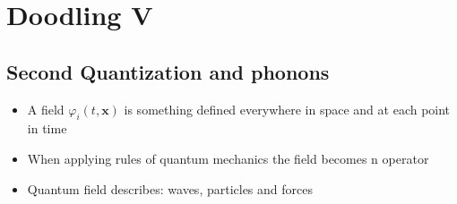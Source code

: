 \documentclass[10pt,a4paper]{book}
\theoremstyle{definition}
\begin{document}
\chapter{Doodling V} %
\section{Second Quantization and phonons}
\begin{itemize}
\item A field $\varphi_i(t,\mathbf{x})$ is something defined everywhere in space and at each point in time
\item When applying rules of quantum mechanics the field becomes n operator
\item Quantum field describes: waves, particles and forces
\end{itemize}
\end{document}
